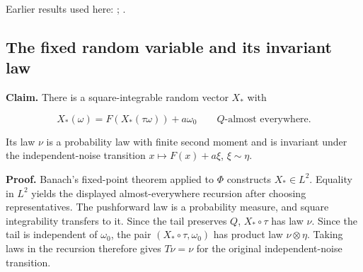 \documentclass[11pt,a4paper]{report}
\begin{document}
Earlier results used here: \cite[Section~3.13.2]{LangevinLean2026ULASC}; \cite[Section~3.13.5]{LangevinLean2026ULASC}.
\subsection{\texorpdfstring{The fixed random variable and its invariant law}{The fixed random variable and its invariant law}}
\label{report-step-WassersteinMixing-Invariant-lean-3}


\textbf{Claim.} There is a square-integrable random vector \(X_*\) with

\[X_*(\omega)=F(X_*(\tau\omega))+a\omega_0\qquad Q\text{-almost everywhere}.\]


Its law \(\nu\) is a probability law with finite second moment and is invariant under the independent-noise transition \(x\mapsto F(x)+a\xi\), \(\xi\sim\eta\).




\textbf{Proof.} Banach's fixed-point theorem applied to \(\Phi\) constructs \(X_*\in L^2\). Equality in \(L^2\) yields the displayed almost-everywhere recursion after choosing representatives. The pushforward law is a probability measure, and square integrability transfers to it. Since the tail preserves \(Q\), \(X_*\circ\tau\) has law \(\nu\). Since the tail is independent of \(\omega_0\), the pair \((X_*\circ\tau,\omega_0)\) has product law \(\nu\otimes\eta\). Taking laws in the recursion therefore gives \(T\nu=\nu\) for the original independent-noise transition.
\end{document}

